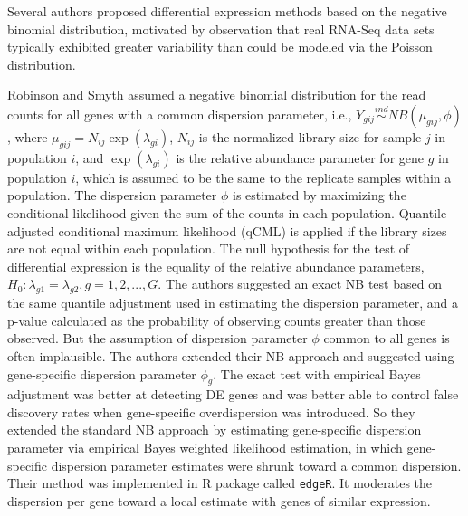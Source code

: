 Several authors proposed differential expression methods based on the negative binomial distribution, motivated by observation that real RNA-Seq data sets typically exhibited greater variability than could be modeled via the Poisson distribution\citep{lorenz2014using}. 

Robinson and Smyth \citep{robinson2007moderated} assumed a negative binomial distribution for the read counts for all genes with a common dispersion parameter, i.e., $Y_{gij} \stackrel{ind}{\sim} NB(\mu_{gij},\phi)$, where $\mu_{gij}=N_{ij}\exp(\lambda_{gi})$, $N_{ij}$ is the normalized library size for sample $j$ in population $i$, and $\exp(\lambda_{gi})$ is the relative abundance parameter for gene $g$ in population $i$, which is assumed to be the same to the replicate samples within a population. The dispersion parameter $\phi$ is estimated by maximizing the conditional likelihood given the sum of the counts in each population. Quantile adjusted conditional maximum likelihood (qCML) is applied if the library sizes are not equal within each population. The null hypothesis for the test of differential expression is the equality of the relative abundance parameters, $H_0: \lambda_{g1} = \lambda_{g2}, g=1,2,...,G$. The authors suggested an exact NB test based on the same quantile adjustment used in estimating the dispersion parameter, and a p-value calculated as the probability of observing counts greater than those observed\citep{lorenz2014using}. But the assumption of dispersion parameter $\phi$ common to all genes is often implausible. The authors extended their NB approach and suggested using gene-specific dispersion parameter $\phi_g$\citep{robinson2007small}. The exact test with empirical Bayes adjustment was better at detecting DE genes and was better able to control false discovery rates when gene-specific overdispersion was introduced\citep{lorenz2014using}. So they extended the standard NB approach by estimating gene-specific dispersion parameter via empirical Bayes weighted likelihood estimation, in which gene-specific dispersion parameter estimates were shrunk toward a common dispersion. Their method was implemented in R package called {\tt edgeR}. It moderates the dispersion per gene toward a local estimate with genes of similar expression. 


